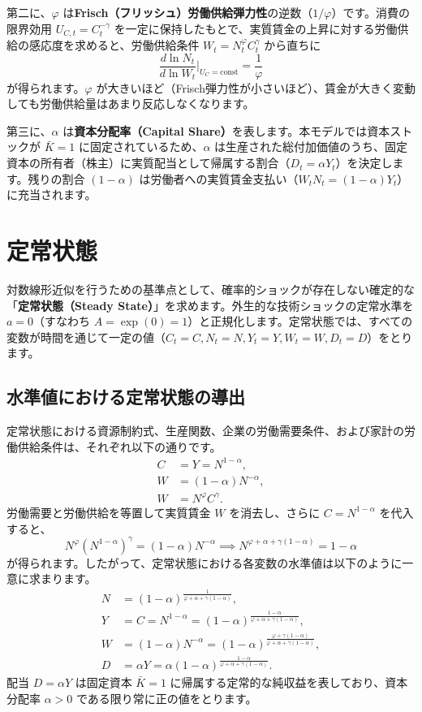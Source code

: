 \documentclass[
  japanese,
  lualatex,
  ja=standard,
  12pt,
  a4paper]{ltjsarticle}
\begin{document}
第二に、\(\varphi\)
は\textbf{Frisch（フリッシュ）労働供給弾力性}の逆数（\(1/\varphi\)）です。消費の限界効用
\(U_{C,t} = C_t^{-\gamma}\)
を一定に保持したもとで、実質賃金の上昇に対する労働供給の感応度を求めると、労働供給条件
\(W_t = N_t^\varphi C_t^\gamma\) から直ちに \[
\frac{d\ln N_t}{d\ln W_t}\bigg|_{U_C = \text{const}} = \frac{1}{\varphi}
\] が得られます。\(\varphi\)
が大きいほど（Frisch弾力性が小さいほど）、賃金が大きく変動しても労働供給量はあまり反応しなくなります。

第三に、\(\alpha\) は\textbf{資本分配率（Capital
Share）}を表します。本モデルでは資本ストックが \(\bar{K}=1\)
に固定されているため、\(\alpha\)
は生産された総付加価値のうち、固定資本の所有者（株主）に実質配当として帰属する割合（\(D_t = \alpha Y_t\)）を決定します。残りの割合
\((1-\alpha)\)
は労働者への実質賃金支払い（\(W_t N_t = (1-\alpha) Y_t\)）に充当されます。

\section{定常状態}\label{ux5b9aux5e38ux72b6ux614b}

対数線形近似を行うための基準点として、確率的ショックが存在しない確定的な「\textbf{定常状態（Steady
State）}」を求めます。外生的な技術ショックの定常水準を
\(a = 0\)（すなわち
\(A = \exp(0) = 1\)）と正規化します。定常状態では、すべての変数が時間を通じて一定の値（\(C_t = C, N_t = N, Y_t = Y, W_t = W, D_t = D\)）をとります。

\subsection{水準値における定常状態の導出}\label{ux6c34ux6e96ux5024ux306bux304aux3051ux308bux5b9aux5e38ux72b6ux614bux306eux5c0eux51fa}

定常状態における資源制約式、生産関数、企業の労働需要条件、および家計の労働供給条件は、それぞれ以下の通りです。
\[
\begin{aligned}
C &= Y = N^{1-\alpha},\\
W &= (1-\alpha) N^{-\alpha},\\
W &= N^\varphi C^\gamma.
\end{aligned}
\] 労働需要と労働供給を等置して実質賃金 \(W\) を消去し、さらに
\(C = N^{1-\alpha}\) を代入すると、 \[
N^\varphi \left( N^{1-\alpha} \right)^\gamma = (1-\alpha) N^{-\alpha} \implies N^{\varphi + \alpha + \gamma(1-\alpha)} = 1 - \alpha
\]
が得られます。したがって、定常状態における各変数の水準値は以下のように一意に求まります。
\[
\begin{aligned}
N &= (1-\alpha)^{\frac{1}{\varphi + \alpha + \gamma(1-\alpha)}},\\
Y &= C = N^{1-\alpha} = (1-\alpha)^{\frac{1-\alpha}{\varphi + \alpha + \gamma(1-\alpha)}},\\
W &= (1-\alpha) N^{-\alpha} = (1-\alpha)^{\frac{\varphi + \gamma(1-\alpha)}{\varphi + \alpha + \gamma(1-\alpha)}},\\
D &= \alpha Y = \alpha (1-\alpha)^{\frac{1-\alpha}{\varphi + \alpha + \gamma(1-\alpha)}}.
\end{aligned}
\] 配当 \(D = \alpha Y\) は固定資本 \(\bar{K}=1\)
に帰属する定常的な純収益を表しており、資本分配率 \(\alpha > 0\)
である限り常に正の値をとります。
\end{document}
